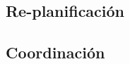 \subsection{Re-planificación}
  \label{sec:replanificacion}
  
  
  
\subsection{Coordinación}
  \label{sec:coordinacion}
  
  
  

